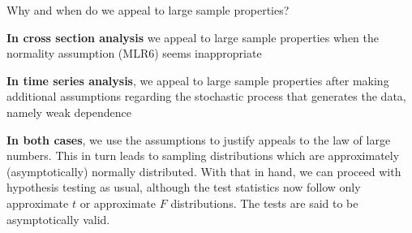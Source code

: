 

\question[2] Why and when do we appeal to large sample properties?

\begin{solution}[\halfpage]
  \textbf{In cross section analysis} we appeal to large sample properties when the normality assumption (MLR6) seems 
  inappropriate
  
  \textbf{In time series analysis}, we appeal to large sample properties after making additional 
  assumptions regarding the stochastic process that generates the data, namely weak dependence
  
  \textbf{In both cases}, we use the assumptions to justify appeals to the law of large numbers. This in turn leads to sampling 
  distributions which are approximately (asymptotically) normally distributed. With that in hand, we can proceed 
  with hypothesis testing as usual, although the test statistics now follow only approximate \(t\) or 
  approximate \(F\) distributions. The tests are said to be asymptotically valid.
\end{solution}

